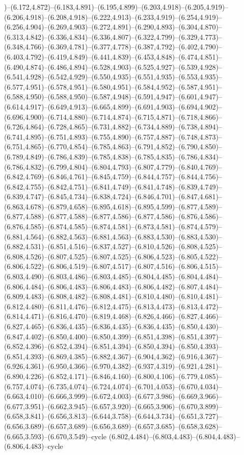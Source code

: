 )--(6.172,4.872)--(6.183,4.891)--(6.195,4.899)--(6.203,4.918)--(6.205,4.919)--(6.206,4.918)--(6.208,4.918)--(6.222,4.913)--(6.233,4.919)--(6.254,4.919)--(6.256,4.904)--(6.269,4.903)--(6.272,4.891)--(6.290,4.893)--(6.304,4.870)--(6.313,4.842)--(6.336,4.834)--(6.336,4.807)--(6.322,4.799)--(6.329,4.773)--(6.348,4.766)--(6.369,4.781)--(6.377,4.778)--(6.387,4.792)--(6.402,4.790)--(6.403,4.792)--(6.419,4.849)--(6.441,4.839)--(6.453,4.848)--(6.474,4.851)--(6.490,4.874)--(6.486,4.894)--(6.528,4.903)--(6.525,4.927)--(6.539,4.928)--(6.541,4.928)--(6.542,4.929)--(6.550,4.935)--(6.551,4.935)--(6.553,4.935)--(6.577,4.951)--(6.578,4.951)--(6.580,4.951)--(6.584,4.952)--(6.587,4.951)--(6.588,4.950)--(6.588,4.950)--(6.587,4.948)--(6.591,4.947)--(6.601,4.947)--(6.614,4.917)--(6.649,4.913)--(6.665,4.899)--(6.691,4.903)--(6.694,4.902)--(6.696,4.900)--(6.714,4.880)--(6.714,4.874)--(6.715,4.871)--(6.718,4.866)--(6.726,4.864)--(6.728,4.865)--(6.731,4.882)--(6.734,4.889)--(6.738,4.894)--(6.741,4.895)--(6.751,4.893)--(6.755,4.890)--(6.757,4.887)--(6.748,4.873)--(6.751,4.865)--(6.770,4.854)--(6.785,4.863)--(6.791,4.852)--(6.790,4.850)--(6.789,4.849)--(6.786,4.839)--(6.785,4.838)--(6.785,4.835)--(6.786,4.834)--(6.786,4.832)--(6.799,4.804)--(6.804,4.793)--(6.807,4.779)--(6.840,4.769)--(6.842,4.769)--(6.846,4.761)--(6.845,4.759)--(6.844,4.757)--(6.844,4.756)--(6.842,4.755)--(6.842,4.751)--(6.841,4.749)--(6.841,4.748)--(6.839,4.749)--(6.839,4.747)--(6.845,4.734)--(6.838,4.724)--(6.846,4.701)--(6.847,4.681)--(6.863,4.678)--(6.879,4.658)--(6.895,4.618)--(6.895,4.599)--(6.877,4.589)--(6.877,4.588)--(6.877,4.588)--(6.877,4.586)--(6.877,4.586)--(6.876,4.586)--(6.876,4.585)--(6.874,4.585)--(6.874,4.581)--(6.873,4.581)--(6.874,4.579)--(6.881,4.564)--(6.882,4.563)--(6.881,4.563)--(6.883,4.530)--(6.883,4.530)--(6.882,4.531)--(6.851,4.516)--(6.837,4.527)--(6.810,4.526)--(6.808,4.525)--(6.808,4.526)--(6.807,4.525)--(6.807,4.525)--(6.806,4.523)--(6.805,4.522)--(6.806,4.522)--(6.806,4.519)--(6.807,4.517)--(6.807,4.516)--(6.806,4.515)--(6.803,4.490)--(6.803,4.486)--(6.803,4.485)--(6.804,4.485)--(6.804,4.484)--(6.806,4.484)--(6.806,4.483)--(6.806,4.483)--(6.806,4.482)--(6.807,4.484)--(6.809,4.483)--(6.808,4.482)--(6.808,4.481)--(6.810,4.480)--(6.810,4.481)--(6.812,4.480)--(6.811,4.476)--(6.812,4.475)--(6.813,4.473)--(6.813,4.472)--(6.814,4.471)--(6.816,4.470)--(6.819,4.468)--(6.826,4.466)--(6.827,4.466)--(6.827,4.465)--(6.836,4.435)--(6.836,4.435)--(6.836,4.435)--(6.850,4.430)--(6.847,4.402)--(6.850,4.400)--(6.850,4.399)--(6.851,4.398)--(6.851,4.397)--(6.852,4.396)--(6.852,4.394)--(6.851,4.394)--(6.850,4.394)--(6.850,4.393)--(6.851,4.393)--(6.869,4.385)--(6.882,4.367)--(6.904,4.362)--(6.916,4.367)--(6.926,4.361)--(6.950,4.366)--(6.970,4.382)--(6.937,4.319)--(6.921,4.281)--(6.890,4.226)--(6.852,4.171)--(6.846,4.160)--(6.800,4.106)--(6.779,4.085)--(6.757,4.074)--(6.735,4.074)--(6.724,4.074)--(6.701,4.053)--(6.670,4.034)--(6.663,4.010)--(6.666,3.999)--(6.672,4.003)--(6.677,3.986)--(6.669,3.966)--(6.677,3.951)--(6.662,3.945)--(6.657,3.920)--(6.665,3.906)--(6.670,3.899)--(6.658,3.841)--(6.656,3.813)--(6.644,3.758)--(6.644,3.734)--(6.651,3.727)--(6.656,3.689)--(6.657,3.689)--(6.656,3.689)--(6.657,3.685)--(6.658,3.628)--(6.665,3.593)--(6.670,3.549)--cycle (6.802,4.484)--(6.803,4.483)--(6.804,4.483)--(6.806,4.483)--cycle 